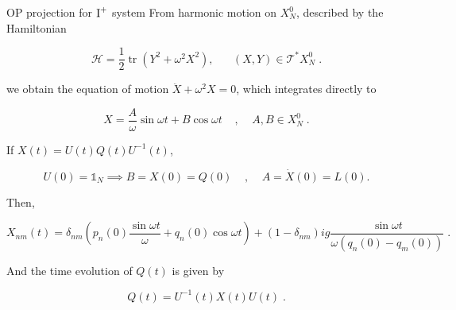 \documentclass[aspectratio=169, 9pt]{beamer}
\begin{document}
\begin{frame}[allowframebreaks]{OP projection for $\textnormal{I}^+$ system}
From harmonic motion on $X^0_N$, described by the Hamiltonian

\begin{equation}
    \mathcal{H} = \frac{1}{2}\operatorname{tr}(Y^2 + \omega^2 X^2), \;\;\;\;\;\;(X,Y) \in \mathcal{T}^\ast X^0_N\;.
\end{equation}

we obtain the equation of motion $\ddot X + \omega^2 X= 0$, which integrates directly to 

\begin{equation}
    X = \frac{A}{\omega}\sin{\omega t} + B\cos{\omega t}\;\;\;\;,\;\;\;\;A, B \in X^0_N\;.
\end{equation}

If $X(t) = U(t) Q(t) U^{-1}(t)$, 

\[U(0) = \mathbb{1}_N \implies B = X(0) = Q(0)\;\;\;\;, \;\;\;\;A = \dot X(0) = L(0).\] 

Then,

\begin{equation}
    X_{nm} (t) = \delta_{nm} (p_n(0)\frac{\sin{\omega t}}{\omega} + q_n(0)\cos{\omega t}) + (1 - \delta_{nm}) ig \frac{\sin{\omega t}}{\omega(q_n(0) - q_m(0))}\;.
\end{equation}

And the time evolution of $Q(t)$ is given by

\begin{equation}
    Q(t) = U^{-1}(t) X(t) U(t)\;.
\end{equation}
\end{frame}
\end{document}

